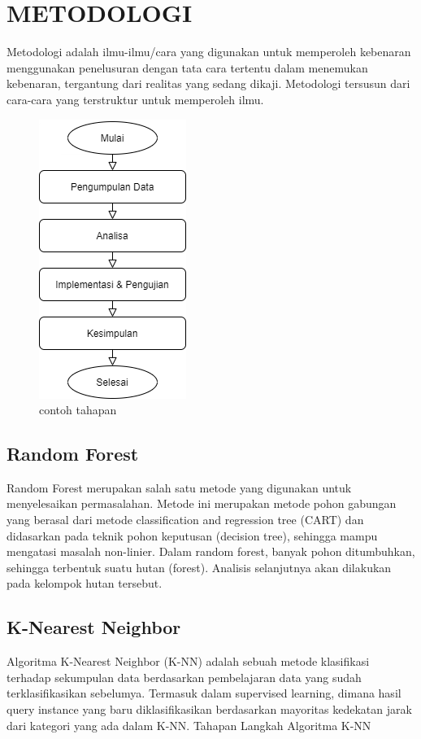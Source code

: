 \documentclass[conference]{IEEEtran}
\begin{document}
\section{METODOLOGI}

Metodologi adalah ilmu-ilmu/cara yang digunakan untuk memperoleh kebenaran menggunakan penelusuran dengan tata cara tertentu dalam menemukan kebenaran, tergantung dari realitas yang sedang dikaji. Metodologi tersusun dari cara-cara yang terstruktur untuk memperoleh ilmu.

\begin{figure}
\centering
\includegraphics[width=.4\textwidth]{Gambar/gambartahapan.png}
\caption{contoh tahapan}
\end{figure}

\subsection{Random Forest}
Random Forest merupakan salah satu metode yang digunakan untuk menyelesaikan permasalahan. Metode ini merupakan metode pohon gabungan yang berasal dari metode
classification and regression tree (CART) dan didasarkan pada
teknik pohon keputusan (decision tree), sehingga mampu mengatasi masalah non-linier. Dalam random forest, banyak pohon
ditumbuhkan, sehingga terbentuk suatu hutan (forest). Analisis
selanjutnya akan dilakukan pada kelompok hutan tersebut.

\subsection{K-Nearest Neighbor}
Algoritma K-Nearest Neighbor (K-NN) adalah sebuah
metode klasifikasi terhadap sekumpulan data berdasarkan
pembelajaran data yang sudah terklasifikasikan sebelumya.
Termasuk dalam supervised learning, dimana hasil query
instance yang baru diklasifikasikan berdasarkan mayoritas
kedekatan jarak dari kategori yang ada dalam K-NN.
Tahapan Langkah Algoritma K-NN
\end{document}
